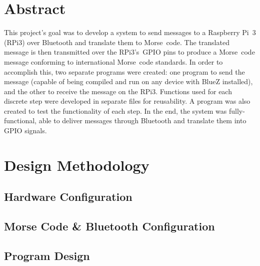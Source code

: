 \documentclass[11pt]{article}
\begin{document}


\section{Abstract}
\label{sec:abstract}


This project's goal was to develop a system to send messages to a Raspberry Pi~3 (RPi3) over Bluetooth and translate them to Morse~code.
The translated message is then transmitted over the RPi3's~GPIO pins to produce a Morse~code message conforming to international Morse~code standards.
In order to accomplish this, two separate programs were created: one program to send the message (capable of being compiled and run on any device with BlueZ installed), and the other to receive the message on the RPi3.
Functions used for each discrete step were developed in separate files for reusability.
A program was also created to test the functionality of each step.
In the end, the system was fully-functional, able to deliver messages through Bluetooth and translate them into GPIO signals.


\section{Design Methodology}
\label{sec:design_methodology}




\subsection{Hardware Configuration}
\label{sub:hardware_configuration}




\subsection{Morse Code \& Bluetooth Configuration}
\label{sub:morse_code_&_bluetooth_configuration}




\subsection{Program Design}
\label{sub:program_design}


\end{document}

